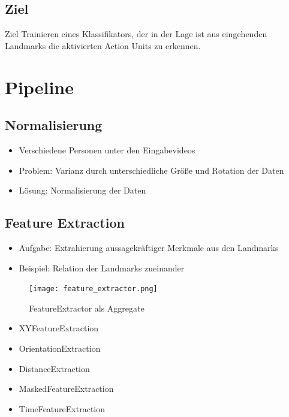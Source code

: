 \documentclass{beamer}
\begin{document}
\subsection{Ziel}
\begin{frame}
  \begin{block}{Ziel}
    Trainieren eines Klassifikators, der in der Lage ist aus eingehenden Landmarks die aktivierten Action Units zu erkennen.
  \end{block}
\end{frame}

\section{Pipeline}
\subsection{Normalisierung}
\begin{frame}
  \begin{itemize}
    \item Verschiedene Personen unter den Eingabevideos
    \item Problem: Varianz durch unterschiedliche Größe und Rotation der Daten
    \item Lösung: Normalisierung der Daten
  \end{itemize}
\end{frame}

\subsection{Feature Extraction}
\begin{frame}
  \begin{itemize}
    \item Aufgabe: Extrahierung aussagekräftiger Merkmale aus den Landmarks
    \item Beispiel: Relation der Landmarks zueinander
  \end{itemize}
\end{frame}

\begin{frame}
\begin{figure}
    \texttt{[image: feature\_extractor.png]}

    \caption{FeatureExtractor als Aggregate}
    \end{figure}
\end{frame}

\begin{frame}
  \begin{itemize}
    \item XYFeatureExtraction
    \item OrientationExtraction
    \item DistanceExtraction
    \item MaskedFeatureExtraction
    \item TimeFeatureExtraction
  \end{itemize}
\end{frame}
\end{document}
